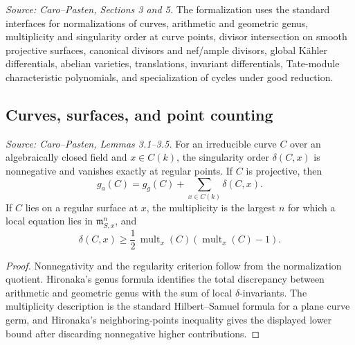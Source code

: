 \begin{definition}
  \label{def:cp_geometry_interfaces}
  \textit{Source: Caro--Pasten, Sections 3 and 5.}
  The formalization uses the standard interfaces for normalizations of curves,
  arithmetic and geometric genus, multiplicity and singularity order at curve
  points, divisor intersection on smooth projective surfaces, canonical divisors
  and nef/ample divisors, global Kähler differentials, abelian varieties,
  translations, invariant differentials, Tate-module characteristic
  polynomials, and specialization of cycles under good reduction.
\end{definition}

\subsection{Curves, surfaces, and point counting}

\begin{lemma}
  \label{lem:cp_curve_singularity_package}
  \textit{Source: Caro--Pasten, Lemmas 3.1--3.5.}
  For an irreducible curve \(C\) over an algebraically closed field and
  \(x\in C(k)\), the singularity order \(\delta(C,x)\) is nonnegative and
  vanishes exactly at regular points.  If \(C\) is projective, then
  \[
    g_a(C)=g_g(C)+\sum_{x\in C(k)}\delta(C,x).
  \]
  If \(C\) lies on a regular surface at \(x\), the multiplicity is the largest
  \(n\) for which a local equation lies in \(\mathfrak m_{S,x}^n\), and
  \[
    \delta(C,x)\ge \frac12\,\operatorname{mult}_x(C)
      (\operatorname{mult}_x(C)-1).
  \]
\end{lemma}
\begin{proof}
  Nonnegativity and the regularity criterion follow from the normalization
  quotient.  Hironaka's genus formula identifies the total discrepancy between
  arithmetic and geometric genus with the sum of local \(\delta\)-invariants.
  The multiplicity description is the standard Hilbert--Samuel formula for a
  plane curve germ, and Hironaka's neighboring-points inequality gives the
  displayed lower bound after discarding nonnegative higher contributions.
\end{proof}

